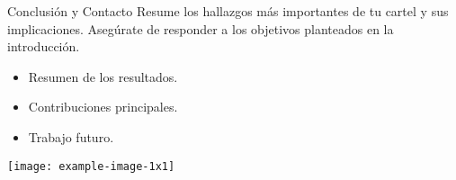 \documentclass[final]{beamer}
\begin{document}
\begin{frame}[t]
\begin{columns}[T]
\begin{column}{0.48\textwidth}
        \begin{block}{Conclusión y Contacto}
            Resume los hallazgos más importantes de tu cartel y sus implicaciones.
            Asegúrate de responder a los objetivos planteados en la introducción.
            \begin{itemize}
                \item Resumen de los resultados.
                \item Contribuciones principales.
                \item Trabajo futuro.
            \end{itemize}
            \vspace{0.5cm}
            \centering
            \texttt{[image: example-image-1x1]} %
        \end{block}

    \end{column}

\end{columns}

\end{frame}
\end{document}
